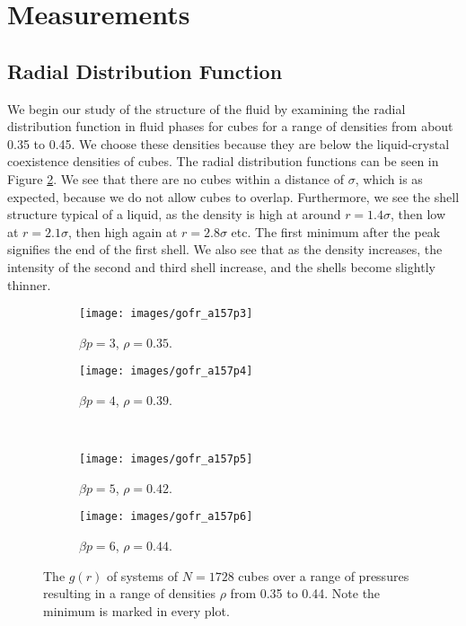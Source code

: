 \documentclass[thesis]{subfiles}
\begin{document}
\newpage

\section{Measurements}

\subsection{Radial Distribution Function} \label{subsec:res_rdf}

We begin our study of the structure of the fluid by examining the radial distribution function in fluid phases for cubes for a range of densities from about 0.35 to 0.45. We choose these densities because they are below the liquid-crystal coexistence densities of cubes. The radial distribution functions can be seen in Figure \ref{fig:gofr_90liq}. We see that there are no cubes within a distance of $\sigma$, which is as expected, because we do not allow cubes to overlap. Furthermore, we see the shell structure typical of a liquid, as the density is high at around $r=1.4\sigma$, then low at $r=2.1\sigma$, then high again at $r=2.8\sigma$ etc.
The first minimum after the peak signifies the end of the first shell. We also see that as the density increases, the intensity of the second and third shell increase, and the shells become slightly thinner.

\begin{figure}[h]
	\centering
	\begin{subfigure}{0.49\textwidth}
		\texttt{[image: images/gofr\_a157p3]}
		\caption{$\beta p = 3$, $\rho = 0.35$. }
	\end{subfigure}
	\begin{subfigure}{0.49\textwidth}
		\texttt{[image: images/gofr\_a157p4]}
		\caption{$\beta p = 4$, $\rho = 0.39$. }
	\end{subfigure}
\\
\vspace{10pt}
	\begin{subfigure}{0.49\textwidth}
		\texttt{[image: images/gofr\_a157p5]}
		\caption{$\beta p = 5$, $\rho = 0.42$. }
	\end{subfigure}
	\begin{subfigure}{0.49\textwidth}
		\texttt{[image: images/gofr\_a157p6]}
		\caption{$\beta p = 6$, $\rho = 0.44$. }\label{fig:gofr_90liqp6}
	\end{subfigure}

	\caption{The $g(r)$ of systems of $N = 1728$ cubes over a range of pressures resulting in a range of densities $\rho$ from 0.35 to 0.44. Note the minimum is marked in every plot.}\label{fig:gofr_90liq}
\end{figure}
\end{document}
